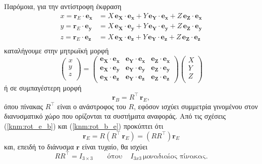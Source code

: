 Παρόμοια, για την αντίστροφη έκφραση 
\begin{align*}
    x = \mathbf{r}_{E} \cdot \mathbf{e_{x}} &= X\, \mathbf{e_{X}} \cdot 
        \mathbf{e_{x}} + Y\, \mathbf{e_{Y}} \cdot \mathbf{e_{x}} + Z\, 
        \mathbf{e_{Z}} \cdot \mathbf{e_{x}} \\
    y = \mathbf{r}_{E} \cdot \mathbf{e_{y}} &= X\, \mathbf{e_{X}} \cdot 
        \mathbf{e_{y}} + Y\, \mathbf{e_{Y}} \cdot \mathbf{e_{y}} + Z\, 
        \mathbf{e_{Z}} \cdot \mathbf{e_{y}} \\
    z = \mathbf{r}_{E} \cdot \mathbf{e_{z}} &= X\, \mathbf{e_{X}} \cdot 
        \mathbf{e_{z}} + Y\, \mathbf{e_{Y}} \cdot \mathbf{e_{z}} + Z\, 
        \mathbf{e_{Z}} \cdot \mathbf{e_{z}} \\
\end{align*}
καταλήγουμε στην μητρωϊκή μορφή
\begin{equation*}
    \begin{pmatrix}
        x \\
        y \\
        z \\
    \end{pmatrix} = 
    \begin{pmatrix}
        \mathbf{e_{X}} \cdot \mathbf{e_{x}} & 
            \mathbf{e_{Y}} \cdot \mathbf{e_{x}} &
            \mathbf{e_{Z}} \cdot \mathbf{e_{x}} \\
        \mathbf{e_{X}} \cdot \mathbf{e_{y}} & 
            \mathbf{e_{Y}} \cdot \mathbf{e_{y}} &
            \mathbf{e_{Z}} \cdot \mathbf{e_{y}} \\
        \mathbf{e_{X}} \cdot \mathbf{e_{z}} & 
            \mathbf{e_{Y}} \cdot \mathbf{e_{z}} &
            \mathbf{e_{Z}} \cdot \mathbf{e_{z}}
    \end{pmatrix}
    \begin{pmatrix}
        X \\
        Y \\
        Z \\
    \end{pmatrix}
\end{equation*}
ή σε συμπαγέστερη μορφή
\begin{equation}
    \mathbf{r}_{B} = R^\intercal\, \mathbf{r}_{E},
    \label{knm:rot_b_e}
\end{equation}
όπου πίνακας \(R^\intercal\) είναι ο ανάστροφος του \(R\), εφόσον ισχύει 
συμμετρία γινομένου στον διανυσματικό χώρο που ορίζονται τα συστήματα αναφοράς.
Από τις σχέσεις (\ref{knm:rot_e_b}) και (\ref{knm:rot_b_e}) προκύπτει ότι
\begin{equation*}
    \mathbf{r}_{E} = R (R^\intercal \, \mathbf{r}_{E}) = 
        (R R^\intercal) \mathbf{r}_{E}
\end{equation*}
και, επειδή το διάνυσμα \(\mathbf{r}\) είναι τυχαίο, θα ισχύει
\begin{equation}
    R R^\intercal = I_{3\times3}  \qquad \text{όπου} \quad \, I_{3x3} \, 
        \text{μοναδιαίος πίνακας}.
    \label{knm:ortho}
\end{equation}

